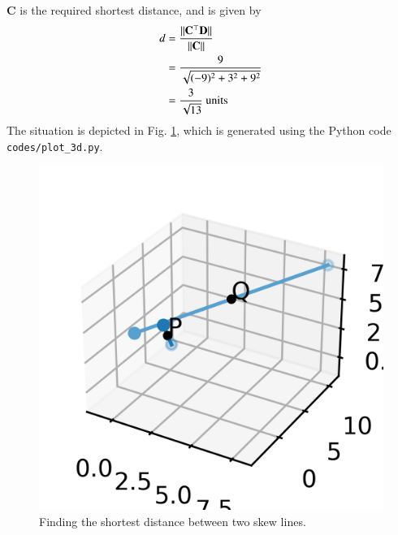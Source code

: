 \documentclass[journal,12pt,twocolumn]{IEEEtran}
\let\vec\mathbf
\begin{document}
\begin{enumerate}
    $\vec{C}$ is the required shortest distance, and is given by
    \begin{align}
        d &= \frac{\norm{\vec{C}^\top\vec{D}}}{\norm{\vec{C}}} \\
          &= \frac{9}{\sqrt{(-9)^2+3^2+9^2}} \\
          &= \frac{3}{\sqrt{13}}\ \textrm{units}
          \label{eq:dist}
    \end{align}
    The situation is depicted in Fig. \ref{fig:plot-3d}, which is generated using 
    the Python code \texttt{codes/plot\_3d.py}.
    \begin{figure}[!ht]
        \centering
        \includegraphics[width=\columnwidth]{figs/plot_3d.png}
        \caption{Finding the shortest distance between two skew lines.}
        \label{fig:plot-3d}
    \end{figure}
\end{enumerate}
\end{document}
